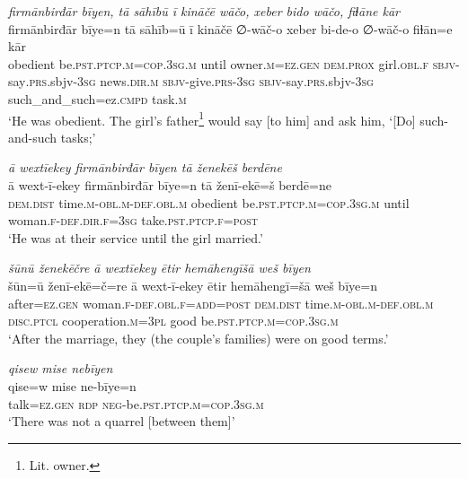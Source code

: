 \ea \label{RE.18}
\textit{firmānbirđār bīyen, tā sāhībū ī kināčē wāčo, xeber bido wāčo, fiɫāne kār} \\ 
\gll firmānbirđār bīye=n tā sāhīb=ū ī kināčē ∅-wāč-o xeber bi-de-o ∅-wāč-o fiɫān=e kār \\ 
 obedient be\textsc{.pst}\textsc{.ptcp}\textsc{.m}\textsc{=cop}\textsc{.3sg}\textsc{.m} until owner\textsc{.m}\textsc{=ez.gen} \textsc{dem.prox} girl\textsc{.obl}\textsc{.f} \textsc{sbjv-}say\textsc{.prs}.sbjv\textsc{-3sg} news\textsc{.dir}\textsc{.m} \textsc{sbjv-}give\textsc{.prs}\textsc{-3sg} \textsc{sbjv-}say\textsc{.prs}.sbjv\textsc{-3sg} such\_and\_such=ez\textsc{.cmpd} task\textsc{.m} \\ 
\glt `He was obedient. The girl’s father\footnote{Lit. owner.} would say [to him] and ask him, ‘[Do] such-and-such tasks;'
\z 
 
\ea \label{RE.21}
\textit{ā wextīekey firmānbirđār bīyen tā ženekēš berdēne} \\ 
\gll ā wext-ī-ekey firmānbirđār bīye=n tā ženī-ekē=š berdē=ne \\ 
 \textsc{dem.dist} time\textsc{.m}\textsc{-obl}\textsc{.m}\textsc{-def}\textsc{.obl}\textsc{.m} obedient be\textsc{.pst}\textsc{.ptcp}\textsc{.m}\textsc{=cop}\textsc{.3sg}\textsc{.m} until woman\textsc{.f}\textsc{-def}\textsc{.dir}\textsc{.f}\textsc{=3sg} take\textsc{.pst}\textsc{.ptcp}\textsc{.f}\textsc{=\textsc{post}} \\ 
\glt `He was at their service until the girl married.'
\z 
 
\ea \label{RE.22}
\textit{šūnū ženekēčre ā wextīekey ētir hemāhengīšā weš bīyen} \\ 
\gll šūn=ū ženī-ekē=č=re ā wext-ī-ekey ētir hemāhengī=šā weš bīye=n \\ 
 after\textsc{=ez.gen} woman\textsc{.f}\textsc{-def}\textsc{.obl}\textsc{.f}\textsc{=add}\textsc{=\textsc{post}} \textsc{dem.dist} time\textsc{.m}\textsc{-obl}\textsc{.m}\textsc{-def}\textsc{.obl}\textsc{.m} \textsc{disc.ptcl} cooperation\textsc{.m}\textsc{=3pl} good be\textsc{.pst}\textsc{.ptcp}\textsc{.m}\textsc{=cop}\textsc{.3sg}\textsc{.m} \\ 
\glt `After the marriage, they (the couple's families) were on good terms.'
\z 
 
\ea \label{RE.23}
\textit{qisew mise nebīyen} \\ 
\gll qise=w mise ne-bīye=n \\ 
 talk\textsc{=ez.gen} \textsc{rdp} \textsc{neg-}be\textsc{.pst}\textsc{.ptcp}\textsc{.m}\textsc{=cop}\textsc{.3sg}\textsc{.m} \\ 
\glt `There was not a quarrel [between them]'
\z 
 
